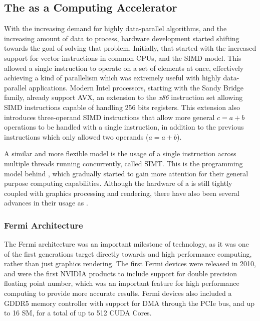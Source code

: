 \documentclass[main.tex]{subfiles}
\begin{document}
\subsection{The \gpu as a Computing Accelerator}

With the increasing demand for highly data-parallel algorithms, and the increasing amount of data to process, hardware development started shifting towards the goal of solving that problem. Initially, that started with the increased support for vector instructions in common \acsp{CPU}, and the \acs{SIMD} model. This allowed a single instruction to operate on a set of elements at once, effectively achieving a kind of parallelism which was extremely useful with highly data-parallel applications. Modern Intel processors, starting with the Sandy Bridge family, already support \ac{AVX}, an extension to the \textit{x86} instruction set allowing \acs{SIMD} instructions capable of handling 256 bits registers. This extension also introduces three-operand \acs{SIMD} instructions that allow more general $c = a + b$ operations to be handled with a single instruction, in addition to the previous instructions which only allowed two operands ($a = a + b$).

A similar and more flexible model is the usage of a single instruction across multiple threads running concurrently, called \ac{SIMT}. This is the programming model behind \gpus, which gradually started to gain more attention for their general purpose computing capabilities. Although the hardware of a \gpus is still tightly coupled with graphics processing and rendering, there have also been several advances in their usage as \gpgpus.


\subsubsection{Fermi Architecture}

The Fermi architecture was an important milestone of \gpus technology, as it was one of the first generations target directly towards \gpgpu and high performance computing, rather than just graphics rendering. The first Fermi devices were released in 2010, and were the first NVIDIA products to include support for double precision floating point number, which was an important feature for high performance computing to provide more accurate results. Fermi devices also included a GDDR5 memory controller with support for \ac{DMA} through the \acs{PCIe} bus, and up to 16 \acf{SM}, for a total of up to 512 \acs{CUDA} Cores.
\end{document}
